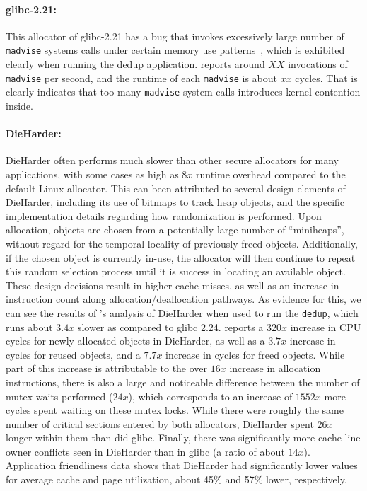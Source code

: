\paragraph{glibc-2.21:}
This allocator of glibc-2.21 has a bug that invokes excessively large number of \texttt{madvise} systems calls under certain memory use patterns~\cite{madvise}, which is exhibited clearly when running the dedup application. \MP{} reports around $XX$ invocations of \texttt{madvise} per second, and the runtime of each \texttt{madvise} is about $xx$ cycles. That is clearly indicates that too many \texttt{madvise} system calls introduces kernel contention inside. 

\paragraph{DieHarder:}
DieHarder often performs much slower than other secure allocators for many applications, with some cases as high as $8x$ runtime overhead compared to the default Linux allocator. This can been attributed to several design elements of DieHarder, including its use of bitmaps to track heap objects, and the specific implementation details regarding how randomization is performed. Upon allocation, objects are chosen from a potentially large number of ``miniheaps'', without regard for the temporal locality of previously freed objects. Additionally, if the chosen object is currently in-use, the allocator will then continue to repeat this random selection process until it is success in locating an available object. These design decisions result in higher cache misses, as well as an increase in instruction count along allocation/deallocation pathways.
As evidence for this, we can see the results of \MP{}'s analysis of DieHarder when used to run the \texttt{dedup}, which runs about $3.4x$ slower as compared to glibc 2.24. \MP{} reports a $320x$ increase in CPU cycles for newly allocated objects in DieHarder, as well as a $3.7x$ increase in cycles for reused objects, and a $7.7x$ increase in cycles for freed objects.
While part of this increase is attributable to the over $16x$ increase in allocation instructions, there is also a large and noticeable difference between the number of mutex waits performed ($24x$), which corresponds to an increase of $1552x$ more cycles spent waiting on these mutex locks. While there were roughly the same number of critical sections entered by both allocators, DieHarder spent $26x$ longer within them than did glibc.
Finally, there was significantly more cache line owner conflicts seen in DieHarder than in glibc (a ratio of about $14x$). Application friendliness data shows that DieHarder had significantly lower values for average cache and page utilization, about 45\% and 57\% lower, respectively.

